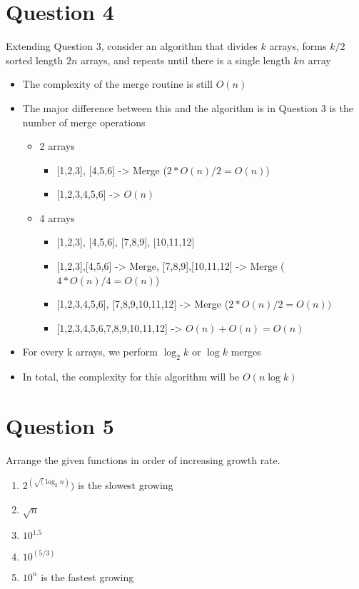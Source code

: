 \documentclass{report}
\begin{document}
    \section{Question 4}
    Extending Question 3, consider an algorithm that divides $k$ arrays, forms $k/2$ sorted length $2n$ arrays,
    and repeats until there is a single length $kn$ array
        \begin{itemize}
            \item{The complexity of the merge routine is still $O(n)$}
            \item{The major difference between this and the algorithm is in Question 3 is the number of merge operations}
                \begin{itemize}
                \item{2 arrays}
                    \begin{itemize}
                        \item{[1,2,3], [4,5,6] -> Merge ($2 * O(n)/2 = O(n)$)}
                        \item{[1,2,3,4,5,6] -> $O(n)$ }
                    \end{itemize}
                \item{4 arrays}
                    \begin{itemize}
                        \item{[1,2,3], [4,5,6], [7,8,9], [10,11,12]}
                        \item{[1,2,3],[4,5,6] -> Merge, [7,8,9],[10,11,12] -> Merge ($4 * O(n)/4 = O(n)$)}
                        \item{[1,2,3,4,5,6], [7,8,9,10,11,12] -> Merge ($2 * O(n)/2 = O(n))$}
                        \item{[1,2,3,4,5,6,7,8,9,10,11,12] -> $O(n) + O(n) = O(n)$}
                    \end{itemize}
                \end{itemize}
            \item{For every k arrays, we perform $\log_2 k$ or $\log k$ merges}
            \item{In total, the complexity for this algorithm will be \textbf{$O(n\log k)$}}
        \end{itemize}

    \section{Question 5}
    Arrange the given functions in order of increasing growth rate.
        \begin{enumerate}
            \item{$2^(\sqrt(\log_2 n))$ is the slowest growing}
            \item{$\sqrt n$}
            \item{$10^1.5$}
            \item{$10^(5/3)$}
            \item{$10^n$ is the fastest growing}
        \end{enumerate}
\end{document}
